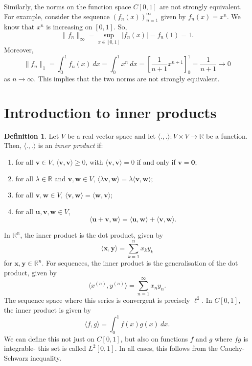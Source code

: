 \documentclass[a4paper, openany]{memoir}
\theoremstyle{definition}
\newtheorem{definition}{Definition}[section]
\theoremstyle{plain}
\begin{document}
Similarly, the norms on the function space $C[0, 1]$ are not strongly equivalent. For example, consider the sequence $(f_n(x))_{n=1}^\infty$ given by $f_n(x) = x^n$. We know that $x^n$ is increasing on $[0, 1]$. So,
\[\lVert f_n \rVert_\infty = \sup_{x \in [0, 1]} |f_n(x)| = f_n(1) = 1.\]
Moreover,
\[\lVert f_n \rVert_1 = \int_0^1 f_n(x) \ dx = \int_0^1 x^n \ dx = \left[\frac{1}{n+1} x^{n+1}\right]_0^1 = \frac{1}{n + 1} \to 0\]
as $n \to \infty$. This implies that the two norms are not strongly equivalent.

\newpage

\section{Introduction to inner products}

\begin{definition}
    Let $V$ be a real vector space and let $\langle ., . \rangle: V \times V \to \mathbb{R}$ be a function. Then, $\langle ., . \rangle$ is an \emph{inner product} if:
    \begin{enumerate}[label=\textbf{I\arabic*.}]
        \item for all $\bm{v} \in V$, $\langle \bm{v}, \bm{v} \rangle \geq 0$, with $\langle \bm{v}, \bm{v} \rangle = 0$ if and only if $\bm{v} = \bm{0}$;
        \item for all $\lambda \in \mathbb{R}$ and $\bm{v}, \bm{w} \in V$, $\langle \lambda \bm{v}, \bm{w} \rangle = \lambda \langle \bm{v}, \bm{w} \rangle$;
        \item for all $\bm{v}, \bm{w} \in V$, $\langle \bm{v}, \bm{w} \rangle = \langle \bm{w}, \bm{v} \rangle$;
        \item for all $\bm{u}, \bm{v}, \bm{w} \in V$,
        \[\langle \bm{u} + \bm{v}, \bm{w} \rangle = \langle \bm{u}, \bm{w} \rangle + \langle \bm{v}, \bm{w} \rangle.\]
    \end{enumerate}
\end{definition}

In $\mathbb{R}^n$, the inner product is the dot product, given by
\[\langle \bm{x}, \bm{y} \rangle = \sum_{k=1}^n x_k y_k\]
for $\bm{x}, \bm{y} \in \mathbb{R}^n$. For sequences, the inner product is the generalisation of the dot product, given by
\[\langle x^{(n)}, y^{(n)} \rangle = \sum_{n=1}^\infty x_ny_n.\]
The sequence space where this series is convergent is precisely $\ell^2$. In $C[0, 1]$, the inner product is given by
\[\langle f, g \rangle = \int_0^1 f(x) g(x) \ dx.\]
We can define this not just on $C[0, 1]$, but also on functions $f$ and $g$ where $fg$ is integrable- this set is called $L^2[0, 1]$. In all cases, this follows from the Cauchy-Schwarz inequality.
\end{document}
